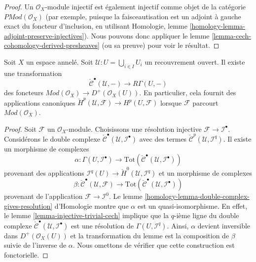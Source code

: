 \begin{proof}

Un $\mathcal{O}_X$-module injectif est également injectif comme objet de la catégorie $\textit{PMod}(\mathcal{O}_X)$ (par exemple, puisque la faisceautisation est un adjoint à gauche exact du foncteur d'inclusion, en utilisant Homologie, lemme \ref{homology-lemma-adjoint-preserve-injectives}). Nous pouvons donc appliquer le lemme \ref{lemma-cech-cohomology-derived-presheaves}
(ou sa preuve) pour voir le résultat.

\end{proof}

\begin{lemma}

\label{lemma-cech-cohomology}
Soit $X$ un espace annelé. Soit $\mathcal{U} : U = \bigcup_{i \in I} U_i$ un recouvrement ouvert. Il existe une transformation $$
\check{\mathcal{C}}^\bullet(\mathcal{U}, -)
\longrightarrow
R\Gamma(U, -)
$$ des foncteurs $\textit{Mod}(\mathcal{O}_X) \to D^{+}(\mathcal{O}_X(U))$. En particulier, cela fournit des applications canoniques $\check{H}^p(\mathcal{U}, \mathcal{F}) \to H^p(U, \mathcal{F})$ lorsque $\mathcal{F}$ parcourt $\textit{Mod}(\mathcal{O}_X)$.
\end{lemma}

\begin{proof}

Soit $\mathcal{F}$ un $\mathcal{O}_X$-module. Choisissons une résolution injective
$\mathcal{F} \to \mathcal{I}^\bullet$. Considérons le double complexe
$\check{\mathcal{C}}^\bullet(\mathcal{U}, \mathcal{I}^\bullet)$ avec des termes
$\check{\mathcal{C}}^p(\mathcal{U}, \mathcal{I}^q)$. Il existe un morphisme de complexes
$$
\alpha :
\Gamma(U, \mathcal{I}^\bullet)
\longrightarrow
\text{Tot}(\check{\mathcal{C}}^\bullet(\mathcal{U}, \mathcal{I}^\bullet))
$$
provenant des applications
$\mathcal{I}^q(U) \to \check{H}^0(\mathcal{U}, \mathcal{I}^q)$
et un morphisme de complexes
$$
\beta :
\check{\mathcal{C}}^\bullet(\mathcal{U}, \mathcal{F})
\longrightarrow
\text{Tot}(\check{\mathcal{C}}^\bullet(\mathcal{U}, \mathcal{I}^\bullet))
$$
provenant de l'application $\mathcal{F} \to \mathcal{I}^0$. Le lemme \ref{homology-lemma-double-complex-gives-resolution} d'Homologie montre que
$\alpha$ est un quasi-isomorphisme. En effet, le lemme \ref{lemma-injective-trivial-cech} implique que la $q$-ième ligne du double complexe
$\check{\mathcal{C}}^\bullet(\mathcal{U}, \mathcal{I}^\bullet)$ est une résolution de $\Gamma(U, \mathcal{I}^q)$. Ainsi, $\alpha$ devient inversible dans $D^{+}(\mathcal{O}_X(U))$ et la transformation du lemme est la composition de $\beta$
suivie de l'inverse de $\alpha$. Nous omettons de vérifier que cette construction est fonctorielle.

\end{proof}

